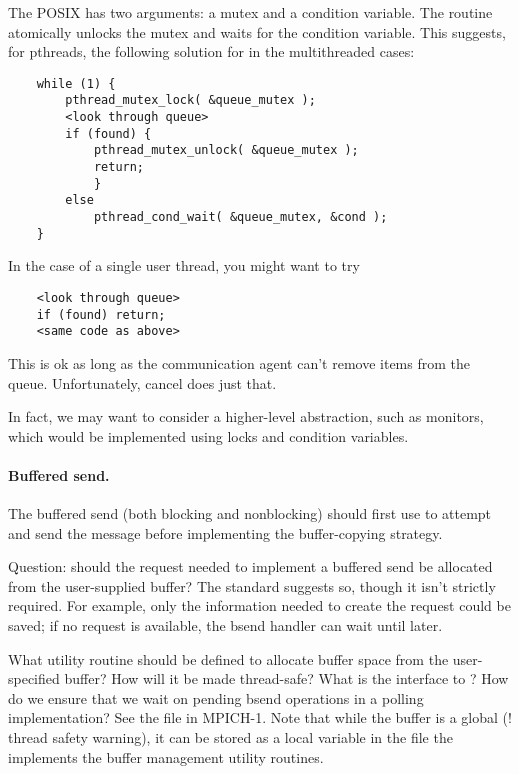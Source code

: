\documentclass{article}
\begin{document}
\begin{adi3}
\begin{mmadi}

The POSIX  has two arguments: a mutex and a condition
variable.  The routine atomically unlocks the mutex and waits for the
condition variable. This suggests, for pthreads, the following solution for
 in the multithreaded cases:
\begin{verbatim}
    while (1) {
        pthread_mutex_lock( &queue_mutex );
        <look through queue>
        if (found) {
            pthread_mutex_unlock( &queue_mutex );
            return;
            }
        else 
            pthread_cond_wait( &queue_mutex, &cond );
    }
\end{verbatim}
In the case of a single user thread, you might want to try
\begin{verbatim}
    <look through queue>
    if (found) return;
    <same code as above>
\end{verbatim}
This is ok as long as the communication agent can't remove items from the
queue.  Unfortunately, cancel does just that.  

In fact, we may want to consider a higher-level abstraction, such as monitors,
which would be implemented using locks and condition variables.
\end{mmadi}
\end{adi3}

\paragraph{Buffered send.}
The buffered send (both blocking and nonblocking) should first use
 to attempt 
and send the message before implementing the buffer-copying strategy.

Question: should the request needed to implement a buffered send be allocated
from the user-supplied buffer?  The standard suggests so, though it isn't
strictly required.  For example, only the information needed to create
the request could be saved; if no request is available, the bsend
handler can wait until later.

What utility routine should be defined to allocate buffer space from the
user-specified buffer?  How will it be made thread-safe?  What is the
interface to ?  How do we ensure that we wait on
pending bsend operations in a polling implementation?  See the file
 in MPICH-1.  Note that while the buffer is
a global (! thread safety warning), it can be stored as a local
 variable in the file the implements the buffer
management utility routines.
\end{document}
